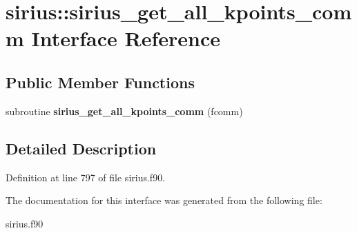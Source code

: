 \hypertarget{interfacesirius_1_1sirius__get__all__kpoints__comm}{}\section{sirius\+:\+:sirius\+\_\+get\+\_\+all\+\_\+kpoints\+\_\+comm Interface Reference}
\label{interfacesirius_1_1sirius__get__all__kpoints__comm}
\subsection*{Public Member Functions}
\begin{DoxyCompactItemize}
\item 
\hypertarget{interfacesirius_1_1sirius__get__all__kpoints__comm_ad56c49281b7c5ff51ee5cb5f20fb9ad4}{}subroutine {\bfseries sirius\+\_\+get\+\_\+all\+\_\+kpoints\+\_\+comm} (fcomm)\label{interfacesirius_1_1sirius__get__all__kpoints__comm_ad56c49281b7c5ff51ee5cb5f20fb9ad4}

\end{DoxyCompactItemize}


\subsection{Detailed Description}


Definition at line 797 of file sirius.\+f90.



The documentation for this interface was generated from the following file\+:\begin{DoxyCompactItemize}
\item 
sirius.\+f90\end{DoxyCompactItemize}
